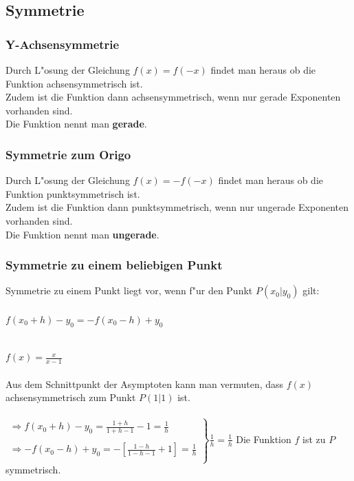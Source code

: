 \subsection{Symmetrie}

\subsubsection{Y-Achsensymmetrie}

Durch L"osung der Gleichung $f(x)=f(-x)$ findet man heraus ob die Funktion achsensymmetrisch ist.\\
Zudem ist die Funktion dann achsensymmetrisch, wenn nur gerade Exponenten vorhanden sind.\\
Die Funktion nennt man \textbf{gerade}.\\

\subsubsection{Symmetrie zum Origo}

Durch L"osung der Gleichung $f(x)=-f(-x)$ findet man heraus ob die Funktion punktsymmetrisch ist.\\
Zudem ist die Funktion dann punktsymmetrisch, wenn nur ungerade Exponenten vorhanden sind.\\
Die Funktion nennt man \textbf{ungerade}.\\


\subsubsection{Symmetrie zu einem beliebigen Punkt}
\begin{Definition}
Symmetrie zu einem Punkt liegt vor, wenn f"ur den Punkt $P(x_{0}|y_{0})$ gilt:\\
\\
$f(x_{0}+h)-y_{0}=-f(x_{0}-h)+y_{0}$
\end{Definition}
\begin{Beispiel}
\\
$f(x)=\frac{x}{x-1}$\\
\\
Aus dem Schnittpunkt der Asymptoten kann man vermuten, dass $f(x)$ achsensymmetrisch zum Punkt $P(1|1)$ ist.\\
\\
$\left. \begin{array}{rcl}
\Rightarrow f(x_{0}+h)-y_{0}=\frac{1+h}{1+h-1}-1=\frac{1}{h}\\
\\
\Rightarrow -f(x_{0}-h)+y_{0}=-[\frac{1-h}{1-h-1}+1]=\frac{1}{h}\\
\end{array}\right\} \frac{1}{h}=\frac{1}{h}$ Die Funktion $f$ ist zu $P$ symmetrisch.\\
\end{Beispiel}


